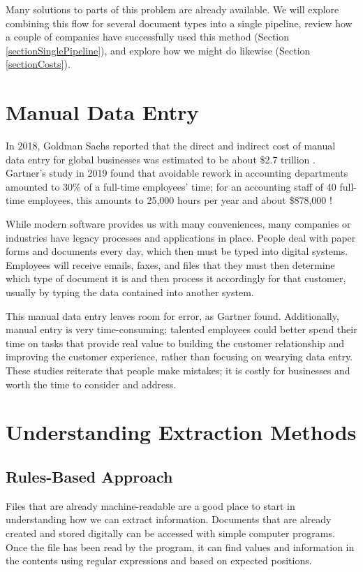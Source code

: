 \documentclass[conference]{IEEEtran}
\begin{document}
Many solutions to parts of this problem are already available. We will explore combining this flow for several document types into a single pipeline, review how a couple of companies have successfully used this method (Section \ref{sectionSinglePipeline}), and explore how we might do likewise (Section \ref{sectionCosts}).

\section{Manual Data Entry} \label{sectionManualDataEntry}
In 2018, Goldman Sachs reported that the direct and indirect cost of manual data entry for global businesses was estimated to be about \$2.7 trillion \cite{schneider2018b2b}. Gartner's study in 2019 found that avoidable rework in accounting departments amounted to 30\% of a full-time employees' time; for an accounting staff of 40 full-time employees, this amounts to 25,000 hours per year and about \$878,000 \cite{lavelle2019gartner}!

While modern software provides us with many conveniences, many companies or industries have legacy processes and applications in place. People deal with paper forms and documents every day, which then must be typed into digital systems. Employees will receive emails, faxes, and files that they must then determine which type of document it is and then process it accordingly for that customer, usually by typing the data contained into another system.

This manual data entry leaves room for error, as Gartner found. Additionally, manual entry is very time-consuming; talented employees could better spend their time on tasks that provide real value to building the customer relationship and improving the customer experience, rather than focusing on wearying data entry. These studies reiterate that people make mistakes; it is costly for businesses and worth the time to consider and address.

\section{Understanding Extraction Methods} \label{sectionExtractionMethods}

\subsection{Rules-Based Approach}
Files that are already machine-readable are a good place to start in understanding how we can extract information. Documents that are already created and stored digitally can be accessed with simple computer programs. Once the file has been read by the program, it can find values and information in the contents using regular expressions and based on expected positions.
\end{document}
